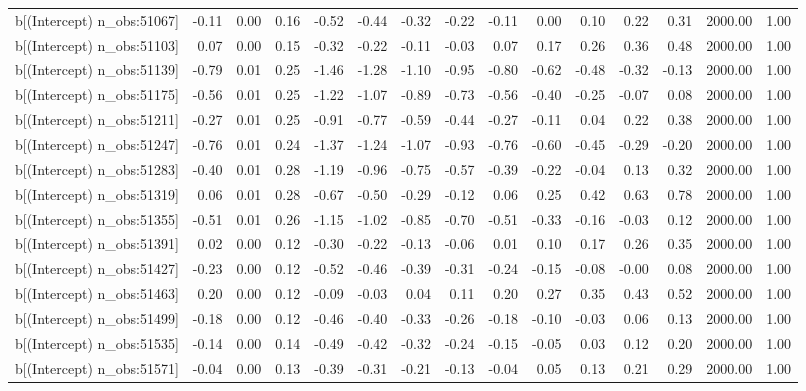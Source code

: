 \begin{table}[ht]
\begin{tabular}{rrrrrrrrrrrrrrr}
  b[(Intercept) n\_obs:51067] & -0.11 & 0.00 & 0.16 & -0.52 & -0.44 & -0.32 & -0.22 & -0.11 & 0.00 & 0.10 & 0.22 & 0.31 & 2000.00 & 1.00 \\ 
  b[(Intercept) n\_obs:51103] & 0.07 & 0.00 & 0.15 & -0.32 & -0.22 & -0.11 & -0.03 & 0.07 & 0.17 & 0.26 & 0.36 & 0.48 & 2000.00 & 1.00 \\ 
  b[(Intercept) n\_obs:51139] & -0.79 & 0.01 & 0.25 & -1.46 & -1.28 & -1.10 & -0.95 & -0.80 & -0.62 & -0.48 & -0.32 & -0.13 & 2000.00 & 1.00 \\ 
  b[(Intercept) n\_obs:51175] & -0.56 & 0.01 & 0.25 & -1.22 & -1.07 & -0.89 & -0.73 & -0.56 & -0.40 & -0.25 & -0.07 & 0.08 & 2000.00 & 1.00 \\ 
  b[(Intercept) n\_obs:51211] & -0.27 & 0.01 & 0.25 & -0.91 & -0.77 & -0.59 & -0.44 & -0.27 & -0.11 & 0.04 & 0.22 & 0.38 & 2000.00 & 1.00 \\ 
  b[(Intercept) n\_obs:51247] & -0.76 & 0.01 & 0.24 & -1.37 & -1.24 & -1.07 & -0.93 & -0.76 & -0.60 & -0.45 & -0.29 & -0.20 & 2000.00 & 1.00 \\ 
  b[(Intercept) n\_obs:51283] & -0.40 & 0.01 & 0.28 & -1.19 & -0.96 & -0.75 & -0.57 & -0.39 & -0.22 & -0.04 & 0.13 & 0.32 & 2000.00 & 1.00 \\ 
  b[(Intercept) n\_obs:51319] & 0.06 & 0.01 & 0.28 & -0.67 & -0.50 & -0.29 & -0.12 & 0.06 & 0.25 & 0.42 & 0.63 & 0.78 & 2000.00 & 1.00 \\ 
  b[(Intercept) n\_obs:51355] & -0.51 & 0.01 & 0.26 & -1.15 & -1.02 & -0.85 & -0.70 & -0.51 & -0.33 & -0.16 & -0.03 & 0.12 & 2000.00 & 1.00 \\ 
  b[(Intercept) n\_obs:51391] & 0.02 & 0.00 & 0.12 & -0.30 & -0.22 & -0.13 & -0.06 & 0.01 & 0.10 & 0.17 & 0.26 & 0.35 & 2000.00 & 1.00 \\ 
  b[(Intercept) n\_obs:51427] & -0.23 & 0.00 & 0.12 & -0.52 & -0.46 & -0.39 & -0.31 & -0.24 & -0.15 & -0.08 & -0.00 & 0.08 & 2000.00 & 1.00 \\ 
  b[(Intercept) n\_obs:51463] & 0.20 & 0.00 & 0.12 & -0.09 & -0.03 & 0.04 & 0.11 & 0.20 & 0.27 & 0.35 & 0.43 & 0.52 & 2000.00 & 1.00 \\ 
  b[(Intercept) n\_obs:51499] & -0.18 & 0.00 & 0.12 & -0.46 & -0.40 & -0.33 & -0.26 & -0.18 & -0.10 & -0.03 & 0.06 & 0.13 & 2000.00 & 1.00 \\ 
  b[(Intercept) n\_obs:51535] & -0.14 & 0.00 & 0.14 & -0.49 & -0.42 & -0.32 & -0.24 & -0.15 & -0.05 & 0.03 & 0.12 & 0.20 & 2000.00 & 1.00 \\ 
  b[(Intercept) n\_obs:51571] & -0.04 & 0.00 & 0.13 & -0.39 & -0.31 & -0.21 & -0.13 & -0.04 & 0.05 & 0.13 & 0.21 & 0.29 & 2000.00 & 1.00 \\ 

\end{tabular}
\end{table}
